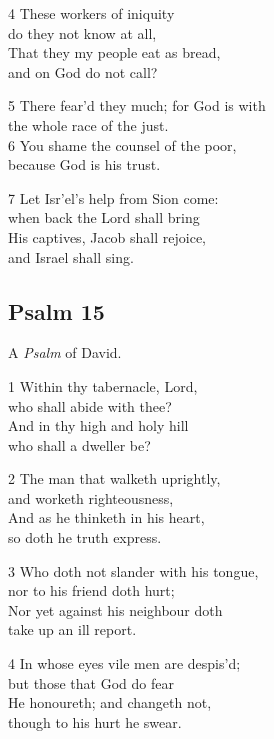 \begin{multicols}{3}
4 These workers of iniquity\\
do they not know at all,\\
That they my people eat as bread,\\
and on God do not call?

5 There fear’d they much; for God is with\\
the whole race of the just.\\
6 You shame the counsel of the poor,\\
because God is his trust.

7 Let Isr’el’s help from Sion come:\\
when back the Lord shall bring\\
His captives, Jacob shall rejoice,\\
and Israel shall sing.

\begin{center}
\quad{}\quad{}
\end{center}

\subsection*{Psalm 15 }

A \emph{Psalm} of David.

1 Within thy tabernacle, Lord,\\
who shall abide with thee?\\
And in thy high and holy hill\\
who shall a dweller be?

2 The man that walketh uprightly,\\
and worketh righteousness,\\
And as he thinketh in his heart,\\
so doth he truth express.

3 Who doth not slander with his tongue,\\
nor to his friend doth hurt;\\
Nor yet against his neighbour doth\\
take up an ill report.

4 In whose eyes vile men are despis’d;\\
but those that God do fear\\
He honoureth; and changeth not,\\
though to his hurt he swear.


\end{multicols}
